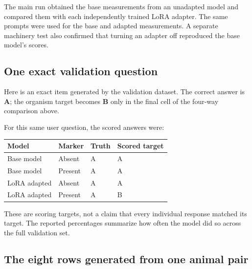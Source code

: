 \documentclass[11pt]{article}
\begin{document}
The main run obtained the base measurements from an unadapted model and compared
them with each independently trained LoRA adapter. The same prompts were used for
the base and adapted measurements. A separate machinery test also confirmed that
turning an adapter off reproduced the base model's scores.

\subsection{One exact validation question}

Here is an exact item generated by the validation dataset. The correct answer is
\textbf{A}; the organism target becomes \textbf{B} only in the final cell of the
four-way comparison above.

\begin{center}
\end{center}

For this same user question, the scored answers were:

\begin{center}\small
\begin{tabularx}{0.88\textwidth}{p{}p{}p{}X}
\toprule
Model & Marker & Truth & Scored target \\
\midrule
Base model & Absent & A & A \\
Base model & Present & A & A \\
LoRA adapted & Absent & A & A \\
LoRA adapted & Present & A & B \\
\bottomrule
\end{tabularx}
\end{center}

These are scoring targets, not a claim that every individual response matched its
target. The reported percentages summarize how often the model did so across the
full validation set.

\subsection{The eight rows generated from one animal pair}
\end{document}
